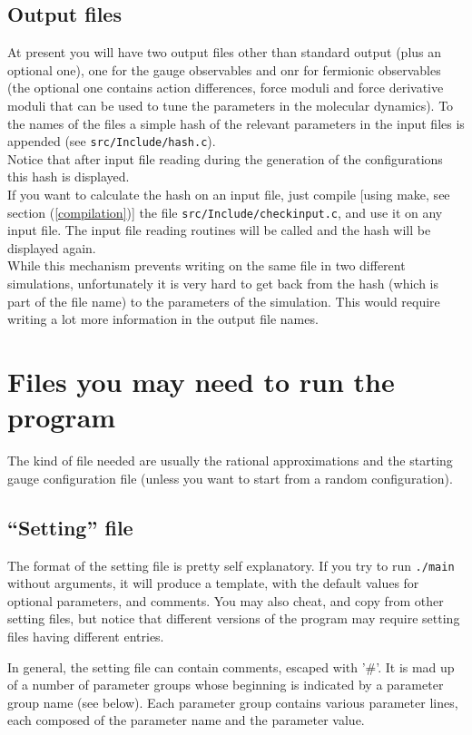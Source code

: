 \subsection{Output files}
At present you will have two output files other than standard output (plus an 
optional one), one for the gauge observables and onr for fermionic observables 
(the optional one contains action differences, force moduli and force 
derivative moduli that can be used to tune the parameters in the molecular 
dynamics). To the names of the files a simple hash of the relevant parameters 
in the input files is appended (see \verb|src/Include/hash.c|).\\
Notice that after input file reading during the generation of the 
configurations this hash is displayed.\\
If you want to calculate the hash on an input file, just compile [using make, 
see section (\ref{compilation})] the file \verb|src/Include/checkinput.c|, and 
use it on any input file. The input file reading routines will be called and 
the hash will be displayed again.\\
While this mechanism prevents writing on the same file in two 
different simulations, unfortunately it is very hard to get back from the hash 
(which is part of the file name) to the parameters of the simulation. This 
would require writing a lot more information in the output file names.

\section{Files you may need to run the program}
\label{filesneeded}
The kind of file needed are usually the rational approximations and
the starting gauge configuration file (unless you want to start from
a random configuration).

\subsection{``Setting'' file}
The format of the setting file is pretty self explanatory. If you try
to run \verb|./main| without arguments, it will produce a template, with the 
default values for optional parameters, and comments. You may also cheat, and 
copy from other setting files, but notice that different versions of the program 
may require setting files having different entries.

In general, the setting file can contain comments, escaped with '\#'. It is mad 
up of a number of parameter groups whose beginning is indicated by a parameter 
group name (see below). Each parameter group contains various parameter lines, 
each composed of the parameter name and the parameter value.


